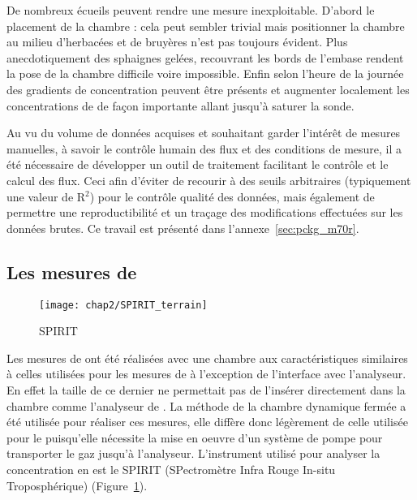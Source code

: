 De nombreux écueils peuvent rendre une mesure inexploitable. D'abord le placement de la chambre : cela peut sembler trivial mais positionner la chambre au milieu d'herbacées et de bruyères n'est pas toujours évident. 
Plus anecdotiquement des sphaignes gelées, recouvrant les bords de l'embase rendent la pose de la chambre difficile voire impossible. 
Enfin selon l'heure de la journée des gradients de concentration peuvent être présents et augmenter localement les concentrations de \coo de façon importante allant jusqu'à saturer la sonde.

Au vu du volume de données acquises et souhaitant garder l'intérêt de mesures manuelles, à savoir le contrôle humain des flux et des conditions de mesure, il a été nécessaire de développer un outil de traitement facilitant le contrôle et le calcul des flux.
Ceci afin d'éviter de recourir à des seuils arbitraires (typiquement une valeur de R$^{2}$) pour le contrôle qualité des données, mais également de permettre une reproductibilité et un traçage des modifications effectuées sur les données brutes.
Ce travail est présenté dans l'annexe~\ref{sec:pckg_m70r}.

\subsection{Les mesures de \texorpdfstring{\chh}{CH4}}

\begin{figure}
\texttt{[image: chap2/SPIRIT\_terrain]}
\caption{SPIRIT}
\label{fig:SPIRIT}
\end{figure}

Les mesures de \chh ont été réalisées avec une chambre aux caractéristiques similaires à celles utilisées pour les mesures de \coo à l'exception de l'interface avec l'analyseur.
En effet la taille de ce dernier ne permettait pas de l'insérer directement dans la chambre comme l'analyseur de \coo.
La méthode de la chambre dynamique fermée a été utilisée pour réaliser ces mesures, elle diffère donc légèrement de celle utilisée pour le \coo puisqu'elle nécessite la mise en oeuvre d'un système de pompe pour transporter le gaz jusqu'à l'analyseur.
L'instrument utilisé pour analyser la concentration en \chh est le SPIRIT (SPectromètre Infra Rouge In-situ Troposphérique) (Figure~\ref{fig:SPIRIT}).

